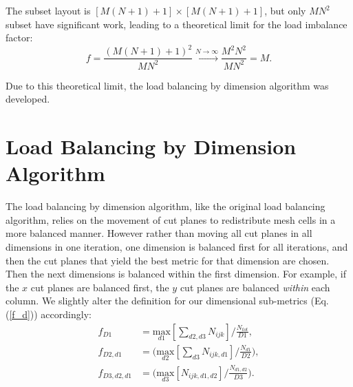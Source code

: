 The subset layout is $[M(N+1)+1] \times [M(N+1)+1]$, but only $MN^2$ subset have significant work, leading to a theoretical limit for the load imbalance factor:
\begin{equation}
f= \frac{\left( M(N+1)+1 \right)^2}{MN^2} \xrightarrow{N\to \infty} \frac{M^2N^2}{MN^2} = M.
\end{equation}

Due to this theoretical limit, the load balancing by dimension algorithm was developed.

\section{Load Balancing by Dimension Algorithm}

The load balancing by dimension algorithm, like the original load balancing algorithm, relies on the movement of cut planes to redistribute mesh cells in a more balanced manner. However rather than moving all cut planes in all dimensions in one iteration, one dimension is balanced first for all iterations, and then the cut planes that yield the best metric for that dimension are chosen. Then the next dimensions is balanced within the first dimension. For example, if the $x$ cut planes are balanced first, the $y$ cut planes are balanced \textit{within} each column.
We slightly alter the definition for our dimensional sub-metrics (Eq. (\ref{f_d})) accordingly:
\begin{align}
f_{D1} &= \underset{d1}{\text{max}}[\sum_{d2,d3} N_{ijk}]/\frac{N_{tot}}{D1}, \label{f_d1} \\
f_{D2,d1} &= \Big(\underset{d2}{\text{max}}[\sum_{d3} N_{ijk,d1}]/\frac{N_{d1}}{D2}\Big), \label{f_d2}\\
f_{D3,d2,d1} &= \Big( \underset{d3}{\text{max}}[ N_{ijk,d1,d2}]/\frac{N_{d1,d2}}{D3} \Big) . \label{f_d3}
\end{align}
